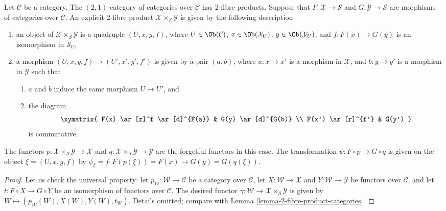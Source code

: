 \begin{lemma}
\label{lemma-2-product-categories-over-C}
Let $\mathcal{C}$ be a category.
The $(2, 1)$-category of categories
over $\mathcal{C}$ has 2-fibre products.
Suppose that
$F : \mathcal{X} \to \mathcal{S}$ and
$G : \mathcal{Y} \to \mathcal{S}$ are morphisms of categories over
$\mathcal{C}$.
An explicit 2-fibre product
$\mathcal{X} \times_\mathcal{S}\mathcal{Y}$ is given by the following
description
\begin{enumerate}
\item an object of $\mathcal{X} \times_\mathcal{S} \mathcal{Y}$ is a quadruple
$(U, x, y, f)$, where $U \in \Ob(\mathcal{C})$,
$x\in \Ob(\mathcal{X}_U)$, $y\in \Ob(\mathcal{Y}_U)$,
and $f : F(x) \to G(y)$ is an isomorphism in $\mathcal{S}_U$,
\item a morphism $(U, x, y, f) \to (U', x', y', f')$ is given by a pair
$(a, b)$, where $a : x \to x'$ is a morphism in $\mathcal{X}$, and
$b : y \to y'$ is a
morphism in $\mathcal{Y}$ such that
\begin{enumerate}
\item $a$ and $b$ induce the same morphism $U \to U'$, and
\item the diagram
$$
\xymatrix{
F(x) \ar[r]^f \ar[d]^{F(a)} & G(y) \ar[d]^{G(b)} \\
F(x') \ar[r]^{f'} & G(y')
}
$$
is commutative.
\end{enumerate}
\end{enumerate}
The functors $p : \mathcal{X} \times_\mathcal{S}\mathcal{Y} \to \mathcal{X}$
and $q : \mathcal{X} \times_\mathcal{S}\mathcal{Y} \to \mathcal{Y}$ are the
forgetful functors in this case. The transformation $\psi : F \circ p \to
G \circ q$ is given on the object $\xi = (U, x, y, f)$ by
$\psi_\xi = f : F(p(\xi)) = F(x) \to G(y) = G(q(\xi))$.
\end{lemma}

\begin{proof}
Let us check the universal property: let
$p_\mathcal{W} : \mathcal{W}\to \mathcal{C}$
be a category over $\mathcal{C}$, let $X : \mathcal{W} \to \mathcal{X}$ and
$Y : \mathcal{W} \to \mathcal{Y}$ be functors over $\mathcal{C}$, and let
$t : F \circ X \to G \circ Y$ be an isomorphism of functors over $\mathcal{C}$.
The desired functor
$\gamma : \mathcal{W} \to \mathcal{X} \times_\mathcal{S} \mathcal{Y}$
is given by $W \mapsto (p_\mathcal{W}(W), X(W), Y(W), t_W)$.
Details omitted; compare with Lemma \ref{lemma-2-fibre-product-categories}.
\end{proof}

